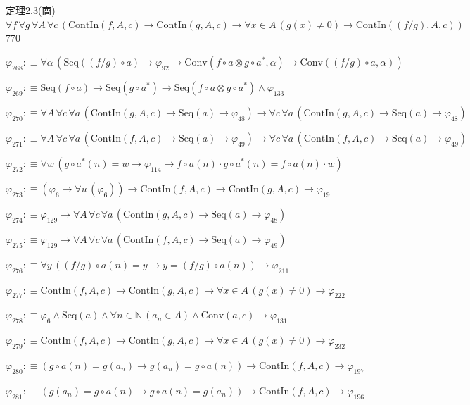 \begin{fullproof}{定理2.3(商)}{$\forall f\,\forall g\,\forall A\,\forall c\,(\mathrm{ContIn}(f,A,c) \to \mathrm{ContIn}(g,A,c) \to \forall x \in A\,(g(x) \neq 0) \to \mathrm{ContIn}((f / g),A,c))$}{770}
\begin{abbrevlist}
\item $\varphi_{268} :\equiv \forall \alpha\,(\mathrm{Seq}((f / g) \circ a) \to \varphi_{92} \to \mathrm{Conv}(f \circ a \otimes g \circ a^{\ast},\alpha) \to \mathrm{Conv}((f / g) \circ a,\alpha))$
\item $\varphi_{269} :\equiv \mathrm{Seq}(f \circ a) \to \mathrm{Seq}(g \circ a^{\ast}) \to \mathrm{Seq}(f \circ a \otimes g \circ a^{\ast}) \land \varphi_{133}$
\item $\varphi_{270} :\equiv \forall A\,\forall c\,\forall a\,(\mathrm{ContIn}(g,A,c) \to \mathrm{Seq}(a) \to \varphi_{48}) \to \forall c\,\forall a\,(\mathrm{ContIn}(g,A,c) \to \mathrm{Seq}(a) \to \varphi_{48})$
\item $\varphi_{271} :\equiv \forall A\,\forall c\,\forall a\,(\mathrm{ContIn}(f,A,c) \to \mathrm{Seq}(a) \to \varphi_{49}) \to \forall c\,\forall a\,(\mathrm{ContIn}(f,A,c) \to \mathrm{Seq}(a) \to \varphi_{49})$
\item $\varphi_{272} :\equiv \forall w\,(g \circ a^{\ast}(n) = w \to \varphi_{114} \to f \circ a(n) \cdot g \circ a^{\ast}(n) = f \circ a(n) \cdot w)$
\item $\varphi_{273} :\equiv (\varphi_{6} \to \forall u\,(\varphi_{6})) \to \mathrm{ContIn}(f,A,c) \to \mathrm{ContIn}(g,A,c) \to \varphi_{19}$
\item $\varphi_{274} :\equiv \varphi_{129} \to \forall A\,\forall c\,\forall a\,(\mathrm{ContIn}(g,A,c) \to \mathrm{Seq}(a) \to \varphi_{48})$
\item $\varphi_{275} :\equiv \varphi_{129} \to \forall A\,\forall c\,\forall a\,(\mathrm{ContIn}(f,A,c) \to \mathrm{Seq}(a) \to \varphi_{49})$
\item $\varphi_{276} :\equiv \forall y\,((f / g) \circ a(n) = y \to y = (f / g) \circ a(n)) \to \varphi_{211}$
\item $\varphi_{277} :\equiv \mathrm{ContIn}(f,A,c) \to \mathrm{ContIn}(g,A,c) \to \forall x \in A\,(g(x) \neq 0) \to \varphi_{222}$
\item $\varphi_{278} :\equiv \varphi_{6} \land \mathrm{Seq}(a) \land \forall n \in \mathbb{N}\,(a_{n} \in A) \land \mathrm{Conv}(a,c) \to \varphi_{131}$
\item $\varphi_{279} :\equiv \mathrm{ContIn}(f,A,c) \to \mathrm{ContIn}(g,A,c) \to \forall x \in A\,(g(x) \neq 0) \to \varphi_{232}$
\item $\varphi_{280} :\equiv (g \circ a(n) = g(a_{n}) \to g(a_{n}) = g \circ a(n)) \to \mathrm{ContIn}(f,A,c) \to \varphi_{197}$
\item $\varphi_{281} :\equiv (g(a_{n}) = g \circ a(n) \to g \circ a(n) = g(a_{n})) \to \mathrm{ContIn}(f,A,c) \to \varphi_{196}$

\end{abbrevlist}
\end{fullproof}
